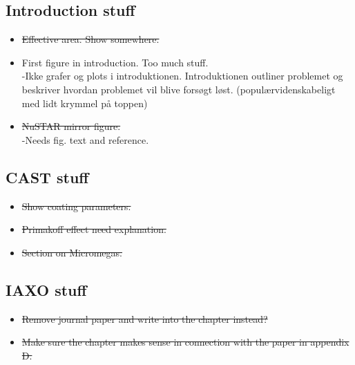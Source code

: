 \subsection{Introduction stuff}
\begin{itemize}
  \item \st{Effective area. Show somewhere.}
  \item First figure in introduction. Too much stuff.\\
      -Ikke grafer og plots i introduktionen. Introduktionen outliner problemet og beskriver hvordan problemet vil blive forsøgt løst. (populærvidenskabeligt med lidt krymmel på toppen)
  \item \st{NuSTAR mirror figure.}\\
      -Needs fig. text and reference.



\end{itemize}


\subsection{CAST stuff}
\begin{itemize}
  \item \st{ Show coating parameters.}
  \item \st{Primakoff effect need explanation.}
  \item \st{Section on Micromegas.}
\end{itemize}

\subsection{IAXO stuff}
\begin{itemize}
  \item \st{ Remove journal paper and write into the chapter instead?}
  \item \st {Make sure the chapter makes sense in connection with the paper in appendix D.}
\end{itemize}
